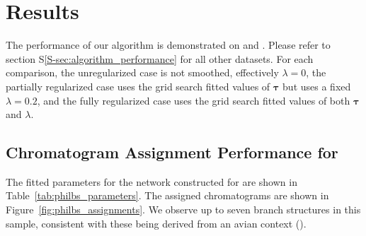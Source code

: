 \section{Results}
The performance of our algorithm is demonstrated on \philbs and \rphumanserum.
Please refer to section S\ref{S-sec:algorithm_performance} for all other datasets.
For each comparison, the unregularized case is not smoothed, effectively $\lambda = 0$,
the partially regularized case uses the grid search fitted values of $\mathbf{\tau}$ but
uses a fixed $\lambda = 0.2$, and the fully regularized case uses the grid search fitted
values of both $\mathbf{\tau}$ and $\lambda$.

\subsection{Chromatogram Assignment Performance for \philbs}
    The fitted parameters for the network constructed for \philbs are shown in
    Table~\ref{tab:philbs_parameters}. The assigned chromatograms are shown in
    Figure~\ref{fig:philbs_assignments}. We observe up to seven branch structures in
    this sample, consistent with these \nglycans being derived from an avian context
    (\cite{Stanley2009,Khatri2016a}).

